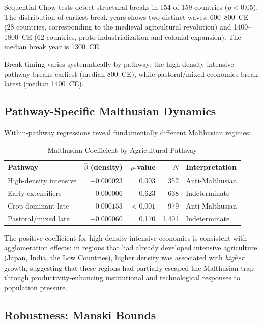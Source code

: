 \documentclass[12pt,letterpaper]{article}
\begin{document}
Sequential Chow tests detect structural breaks in 154 of 159 countries ($p < 0.05$). The distribution of earliest break years shows two distinct waves: 600--800~CE (28 countries, corresponding to the medieval agricultural revolution) and 1400--1800~CE (62 countries, proto-industrialization and colonial expansion). The median break year is 1300~CE.

Break timing varies systematically by pathway: the high-density intensive pathway breaks earliest (median 800~CE), while pastoral/mixed economies break latest (median 1400~CE).

\subsection{Pathway-Specific Malthusian Dynamics}

Within-pathway regressions reveal fundamentally different Malthusian regimes:

\begin{table}[H]
\centering
\caption{Malthusian Coefficient by Agricultural Pathway}
\label{tab:malthusian_by_pathway}
\small
\begin{tabular}{lrrrl}
\toprule
Pathway & $\hat{\beta}$ (density) & $p$-value & $N$ & Interpretation \\
\midrule
High-density intensive & $+0.000023$ & 0.003 & 352 & Anti-Malthusian \\
Early extensifiers & $-0.000006$ & 0.623 & 638 & Indeterminate \\
Crop-dominant late & $+0.000153$ & $<0.001$ & 979 & Anti-Malthusian \\
Pastoral/mixed late & $+0.000060$ & 0.170 & 1,401 & Indeterminate \\
\bottomrule
\end{tabular}
\end{table}

The positive coefficient for high-density intensive economies is consistent with agglomeration effects: in regions that had already developed intensive agriculture (Japan, India, the Low Countries), higher density was associated with \textit{higher} growth, suggesting that these regions had partially escaped the Malthusian trap through productivity-enhancing institutional and technological responses to population pressure.

\subsection{Robustness: Manski Bounds}
\end{document}
